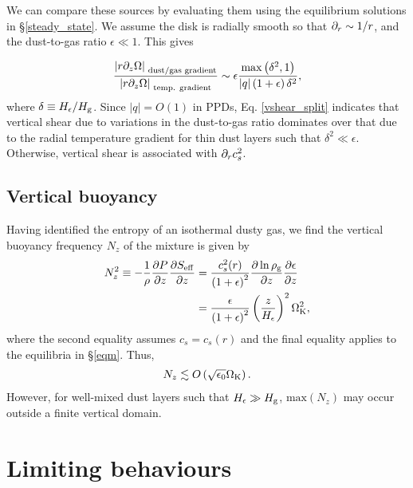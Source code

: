 We can compare these sources by 
evaluating them using the equilibrium
solutions in \S\ref{steady_state}. We assume the disk is radially
smooth so that $\partial_r\sim 1/r$, and the dust-to-gas ratio
$\epsilon\ll1$. This gives 

\begin{align}\label{vshear_split}
  \frac{\left|r\partial_z\Omega\right|_{\text{
        dust/gas gradient}}}{\left|r\partial_z\Omega\right|_{\text{
        temp. gradient}}} \sim
 \epsilon \frac{\mathrm{max}\left(\delta^2,
    1\right)}{\left|q\right|\left(1+\epsilon\right)\delta^2},
\end{align}
where $\delta\equiv H_\epsilon/H_\mathrm{g}$. 
Since $|q|=O(1)$ in PPDs, Eq. \ref{vshear_split} indicates that
vertical shear due to variations in the dust-to-gas ratio dominates 
over that due to the radial temperature gradient for thin dust layers
such that $\delta^2\ll \epsilon$. Otherwise, vertical shear is
associated with $\partial_rc_s^2$.  

\subsection{Vertical buoyancy}\label{vbuoyancy}
Having identified the entropy of an isothermal dusty gas, we find the
vertical buoyancy frequency $N_z$ of the mixture is given by 
\begin{align}
  N_z^2 \equiv - \frac{1}{\rho}\frac{\partial P}{\partial z}\frac{\partial S_\mathrm{eff}}{\partial z} &=
  \frac{c_s^2(r)}{\left(1+\epsilon\right)^2}\frac{\partial\ln\rho_\mathrm{g}}{\partial 
  z}\frac{\partial\epsilon}{\partial z} \\ &
                                  =
  \frac{\epsilon}{\left(1+\epsilon\right)^2}\left(\frac{z}{H_\epsilon}\right)^2\Omega_{\rm K}^2\notag,  
\end{align}
where the second equality assumes $c_s=c_s(r)$ and the final equality
applies to the equilibria in \S\ref{eqm}. Thus,  
\begin{align*}
N_z\lesssim
O\left(\sqrt{\epsilon_0}\Omega_{\rm K}\right). 
\end{align*}
However, for well-mixed dust layers such that $H_\epsilon \gg H_\mathrm{g}$, 
$\mathrm{max}\left(N_z\right)$ may occur outside a finite vertical domain.  



\section{Limiting behaviours}\label{limits}

